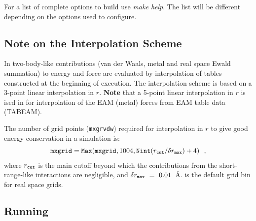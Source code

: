 For a list of complete options to build use {\sl make help}.  The list will be different
depending on the options used to configure.

\subsection{Note on the Interpolation Scheme}
\label{interpolation}

In \D two-body-like contributions (van der Waals,
metal and real space Ewald summation)
to energy and force are evaluated by interpolation of tables
constructed at the beginning of execution.  The \D interpolation
scheme is based on a 3-point linear interpolation in $r$.  {\bf Note}
that a 5-point linear interpolation in $r$ is ised in \D for
interpolation of the EAM (metal) forces from EAM table data (TABEAM).

The number of grid points ({\tt mxgrvdw}) required for interpolation in
$r$ to give good energy conservation in a simulation is:
\[ {\tt mxgrid} = {\tt Max}({\tt mxgrid}, 1004, {\tt Nint}(r_{\tt cut}/\delta r_{\tt max}) + 4)~~, \]
where $r_{\tt cut}$ is the main cutoff beyond which the contributions
from the short-range-like interactions are negligible, and $\delta r_{\tt max}~=~0.01$~\AA.
is the default grid bin for real space grids.

\subsection{Running}

